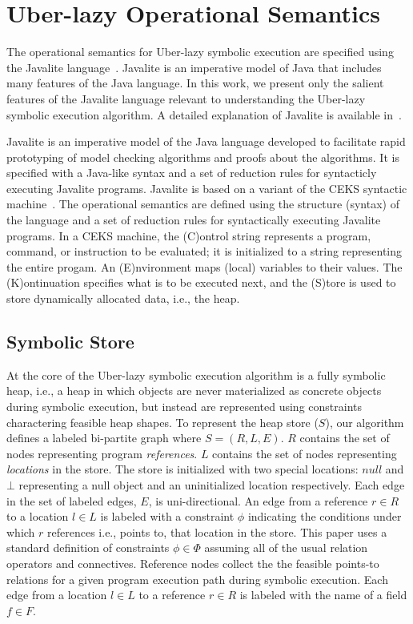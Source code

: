 \section{Uber-lazy Operational Semantics}
\label{semantics}

The operational semantics for Uber-lazy
symbolic execution are specified using the Javalite 
language~\cite{saints-MS}. Javalite is an imperative model of Java
that includes many features of the Java language. In this work, we 
present only the salient features of the Javalite
language relevant to understanding the Uber-lazy symbolic execution
algorithm. A detailed explanation of Javalite is available in~\cite{saints-MS}.

Javalite is an imperative model of the Java language
developed to facilitate rapid prototyping 
of model checking algorithms and proofs about the
algorithms. It is specified with a Java-like syntax and a set
of reduction rules for syntacticly executing Javalite programs.
Javalite is based on a variant of the CEKS syntactic 
machine~\cite{Felleisen:1987}. The operational semantics are 
defined using the structure (syntax)
of the language and a set of reduction rules for syntactically
executing Javalite programs. In a CEKS machine, the
(C)ontrol string represents a program, command, or instruction to be
evaluated; it is initialized to a string representing the entire progam. 
An (E)nvironment  maps (local) variables to their values. The (K)ontinuation 
specifies what is to be executed next, and the (S)tore is used to store 
dynamically allocated data, i.e., the heap. 

\subsection{Symbolic Store}

At the core of the Uber-lazy symbolic execution algorithm
is a fully symbolic heap, i.e., a heap in which objects
are never materialized as concrete objects during symbolic
execution, but instead are represented using constraints
charactering feasible heap shapes. To represent the heap
store ($S$), our algorithm defines a labeled bi-partite 
graph where $S = (R, L, E)$.  $R$ contains the set of nodes 
representing program \emph{references}.
$L$ contains the set of nodes representing \emph{locations} in the store. 
The store is initialized with two special locations: $null$ and $\bot$ representing a null object
and an uninitialized location respectively. Each edge in the set of labeled
edges, $E$, is uni-directional. An edge from a reference $r \in R$ to a location $l \in L$ is
labeled with a constraint $\phi$ indicating the conditions under which $r$ references
i.e., points to, that location in the store. This paper uses a standard definition
of constraints $\phi \in \Phi$ assuming all of the usual relation operators and connectives.
Reference nodes collect the the
feasible points-to relations for a given program execution path during symbolic execution.
Each edge from a location $l \in L$ to a reference $r \in R$ is labeled with the 
name of a field $f \in F$. 


